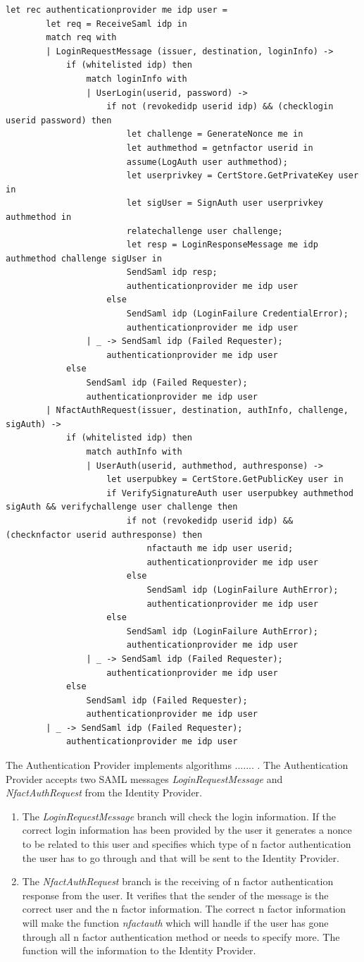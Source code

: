 \documentclass[twosided]{report}
\begin{document}
\begin{lstlisting}[style=fstar, caption={Specification of the authentication provider}]
	let rec authenticationprovider me idp user =
		let req = ReceiveSaml idp in
		match req with
		| LoginRequestMessage (issuer, destination, loginInfo) ->
			if (whitelisted idp) then
				match loginInfo with
				| UserLogin(userid, password) ->
					if not (revokedidp userid idp) && (checklogin userid password) then
						let challenge = GenerateNonce me in
						let authmethod = getnfactor userid in
						assume(LogAuth user authmethod);
						let userprivkey = CertStore.GetPrivateKey user in
						let sigUser = SignAuth user userprivkey authmethod in
						relatechallenge user challenge;
						let resp = LoginResponseMessage me idp authmethod challenge sigUser in
						SendSaml idp resp;
						authenticationprovider me idp user
					else
						SendSaml idp (LoginFailure CredentialError);
						authenticationprovider me idp user
				| _ -> SendSaml idp (Failed Requester);
					authenticationprovider me idp user
			else
				SendSaml idp (Failed Requester);
				authenticationprovider me idp user
		| NfactAuthRequest(issuer, destination, authInfo, challenge, sigAuth) ->
			if (whitelisted idp) then
				match authInfo with
				| UserAuth(userid, authmethod, authresponse) ->
					let userpubkey = CertStore.GetPublicKey user in
					if VerifySignatureAuth user userpubkey authmethod sigAuth && verifychallenge user challenge then
						if not (revokedidp userid idp) && (checknfactor userid authresponse) then
							nfactauth me idp user userid;
							authenticationprovider me idp user
						else
							SendSaml idp (LoginFailure AuthError);
							authenticationprovider me idp user
					else
						SendSaml idp (LoginFailure AuthError);
						authenticationprovider me idp user
				| _ -> SendSaml idp (Failed Requester);
					authenticationprovider me idp user
			else
				SendSaml idp (Failed Requester);
				authenticationprovider me idp user
		| _ -> SendSaml idp (Failed Requester);
			authenticationprovider me idp user
\end{lstlisting}
The Authentication Provider implements algorithms ....... . The Authentication Provider accepts two SAML messages \emph{LoginRequestMessage} and \emph{NfactAuthRequest} from the Identity Provider.
\begin{enumerate}
\item The \emph{LoginRequestMessage} branch will check the login information. If the correct login information has been provided by the user it generates a nonce to be related to this user and specifies which type of n factor authentication the user has to go through and that will be sent to the Identity Provider.
\item The \emph{NfactAuthRequest} branch is the receiving of n factor authentication response from the user. It verifies that the sender of the message is the correct user and the n factor information. The correct n factor information will make the function \emph{nfactauth} which will handle if the user has gone through all n factor authentication method or needs to specify more. The function will the information to the Identity Provider.
\end{enumerate}
\end{document}
